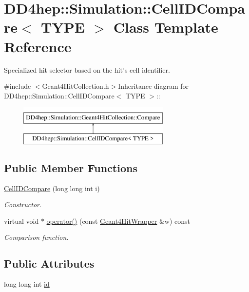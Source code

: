 \hypertarget{class_d_d4hep_1_1_simulation_1_1_cell_i_d_compare}{
\section{DD4hep::Simulation::CellIDCompare$<$ TYPE $>$ Class Template Reference}
\label{class_d_d4hep_1_1_simulation_1_1_cell_i_d_compare}
}


Specialized hit selector based on the hit's cell identifier.  


{\ttfamily \#include $<$Geant4HitCollection.h$>$}Inheritance diagram for DD4hep::Simulation::CellIDCompare$<$ TYPE $>$::\begin{figure}[H]
\begin{center}
\leavevmode
\includegraphics[height=2cm]{class_d_d4hep_1_1_simulation_1_1_cell_i_d_compare}
\end{center}
\end{figure}
\subsection*{Public Member Functions}
\begin{DoxyCompactItemize}
\item 
\hyperlink{class_d_d4hep_1_1_simulation_1_1_cell_i_d_compare_ad644f00808767564625f5ef98303bf0c}{CellIDCompare} (long long int i)
\begin{DoxyCompactList}\small\item\em Constructor. \item\end{DoxyCompactList}\item 
virtual void $\ast$ \hyperlink{class_d_d4hep_1_1_simulation_1_1_cell_i_d_compare_af0477f875a7b24c338da10245a1a1253}{operator()} (const \hyperlink{class_d_d4hep_1_1_simulation_1_1_geant4_hit_wrapper}{Geant4HitWrapper} \&w) const 
\begin{DoxyCompactList}\small\item\em Comparison function. \item\end{DoxyCompactList}\end{DoxyCompactItemize}
\subsection*{Public Attributes}
\begin{DoxyCompactItemize}
\item 
long long int \hyperlink{class_d_d4hep_1_1_simulation_1_1_cell_i_d_compare_a7d3ef2b98bd08b158688ac8f03ea098f}{id}
\end{DoxyCompactItemize}


